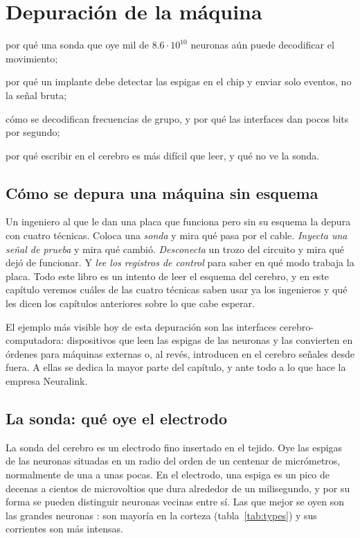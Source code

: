 \chapter{Depuración de la máquina}
\label{sec:debugging}
\begin{chaptergoals}
\item por qué una sonda que oye mil de $8.6\cdot10^{10}$ neuronas aún puede decodificar el movimiento;
\item por qué un implante debe detectar las espigas en el chip y enviar solo eventos, no la señal bruta;
\item cómo se decodifican frecuencias de grupo, y por qué las interfaces dan pocos bits por segundo;
\item por qué escribir en el cerebro es más difícil que leer, y qué no ve la sonda.
\end{chaptergoals}

\section{Cómo se depura una máquina sin esquema}

Un ingeniero al que le dan una placa que funciona pero sin su esquema la depura con cuatro técnicas. Coloca una \emph{sonda} y mira qué pasa por el cable. \emph{Inyecta una señal de prueba} y mira qué cambió. \emph{Desconecta} un trozo del circuito y mira qué dejó de funcionar. Y \emph{lee los registros de control} para saber en qué modo trabaja la placa. Todo este libro es un intento de leer el esquema del cerebro, y en este capítulo veremos cuáles de las cuatro técnicas saben usar ya los ingenieros y qué les dicen los capítulos anteriores sobre lo que cabe esperar.

El ejemplo más visible hoy de esta depuración son las interfaces cerebro-computadora: dispositivos que leen las espigas de las neuronas y las convierten en órdenes para máquinas externas o, al revés, introducen en el cerebro señales desde fuera. A ellas se dedica la mayor parte del capítulo, y ante todo a lo que hace la empresa Neuralink.

\section{La sonda: qué oye el electrodo}

La sonda del cerebro es un electrodo fino insertado en el tejido. Oye las espigas de las neuronas situadas en un radio del orden de un centenar de micrómetros, normalmente de una a unas pocas. En el electrodo, una espiga es un pico de decenas a cientos de microvoltios que dura alrededor de un milisegundo, y por su forma se pueden distinguir neuronas vecinas entre sí. Las que mejor se oyen son las grandes neuronas : son mayoría en la corteza (tabla~\ref{tab:types}) y sus corrientes son más intensas.

